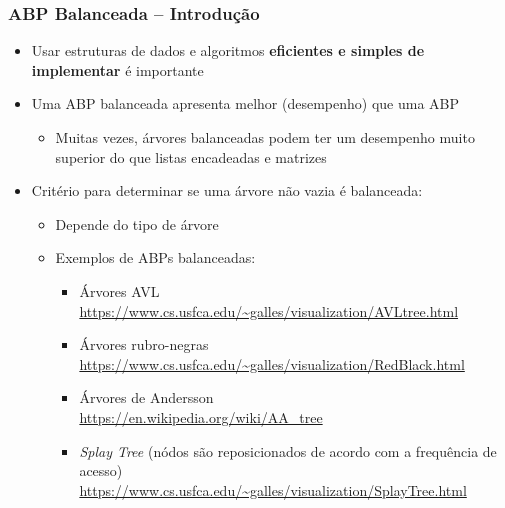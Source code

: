 \documentclass[aspectratio=169]{beamer}
\begin{document}
\begin{frame}\frametitle{ABP Balanceada -- Introdução}
\begin{itemize}
	\item Usar estruturas de dados e algoritmos \textbf{eficientes e simples de implementar} é importante
	\item Uma ABP balanceada apresenta melhor (desempenho) que uma ABP
	\begin{itemize}
		\item Muitas vezes, árvores balanceadas podem ter um desempenho muito superior do que listas encadeadas e matrizes
	\end{itemize}	
	\item Critério para determinar se uma árvore não vazia é balanceada:
	\begin{itemize}
		\item Depende do tipo de árvore
		\item Exemplos de ABPs balanceadas:
		\begin{itemize}
			\item Árvores AVL\\
				\url{https://www.cs.usfca.edu/~galles/visualization/AVLtree.html}
			\item Árvores rubro-negras\\
				\url{https://www.cs.usfca.edu/~galles/visualization/RedBlack.html}
			\item Árvores de Andersson\\
				\url{https://en.wikipedia.org/wiki/AA_tree}
			\item \emph{Splay Tree} (nódos são reposicionados de acordo com a frequência de acesso)\\
				\url{https://www.cs.usfca.edu/~galles/visualization/SplayTree.html}
			\end{itemize}
	\end{itemize}
\end{itemize}
\end{frame}
\end{document}
